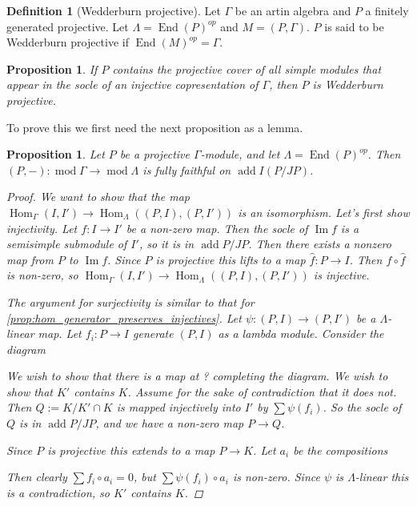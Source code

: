 \documentclass[11pt, a4paper, english]{article}
\newtheorem{prop}[theorem]{Proposition}
\theoremstyle{definition}
\newtheorem{defn}[theorem]{Definition}
\DeclareMathOperator{\Hom}{Hom}
\DeclareMathOperator{\End}{End}
\DeclareMathOperator{\Image}{Im}
\DeclareMathOperator{\add}{add}
\def\mod{\operatorname{mod}}
\begin{document}
\begin{defn}[Wedderburn projective]
	Let $\Gamma$ be an artin algebra and $P$ a finitely generated projective. Let $\Lambda = \End(P)^{op}$ and $M=(P, \Gamma)$. $P$ is said to be Wedderburn projective if $\End(M)^{op}=\Gamma$.
\end{defn}

\begin{prop}\label{prop:wedderburn_criterion}
	If $P$ contains the projective cover of all simple modules that appear in the socle of an injective copresentation of $\Gamma$, then $P$ is Wedderburn projective.
\end{prop}

To prove this we first need the next proposition as a lemma.

\begin{prop}
	Let $P$ be a projective $\Gamma$-module, and let $\Lambda = \End(P)^{op}$. Then $(P, -):\mod \Gamma \to \mod \Lambda$ is fully faithful on $\add I(P/JP)$.
	\begin{proof}
		We want to show that the map $\Hom_\Gamma(I, I') \to \Hom_\Lambda((P,I), (P, I'))$ is an isomorphism. Let's first show injectivity. Let $f:I\to I'$ be a non-zero map. Then the socle of $\Image f$ is a semisimple submodule of $I'$, so it is in $\add P/JP$. Then there exists a nonzero map from $P$ to $\Image f$. Since $P$ is projective this lifts to a map $\hat{f}:P\to I$. Then $f \circ \hat{f}$ is non-zero, so $\Hom_\Gamma(I, I') \to \Hom_\Lambda((P,I), (P, I'))$ is injective.
		
		The argument for surjectivity is similar to that for \cref{prop:hom_generator_preserves_injectives}. Let $\psi:(P,I)\to (P, I')$ be a $\Lambda$-linear map. Let $f_i:P\to I$ generate $(P,I)$ as a lambda module. Consider the diagram
		\begin{center}
		\end{center}
		We wish to show that there is a map at ? completing the diagram. We wish to show that $K'$ contains $K$. Assume for the sake of contradiction that it does not. Then $Q := K / K' \cap K$ is mapped injectively into $I'$ by $\sum \psi(f_i)$. So the socle of $Q$ is in $\add P/JP$, and we have a non-zero map $P \to Q$.
		
		Since $P$ is projective this extends to a map $P \to K$. Let $a_i$ be the compositions 
		Then clearly $\sum f_i \circ a_i = 0$, but $\sum \psi(f_i) \circ a_i$ is non-zero. Since $\psi$ is $\Lambda$-linear this is a contradiction, so $K'$ contains $K$.
		

\end{proof}
\end{prop}
\end{document}
